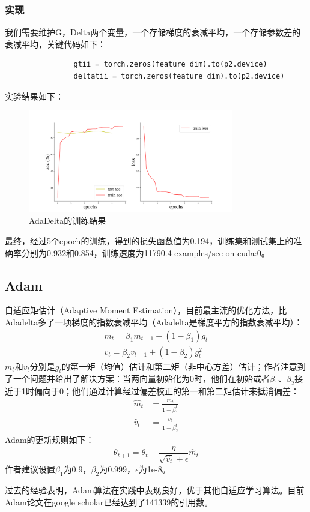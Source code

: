 \documentclass[10.5pt,a4paper]{article}%
\begin{document}
            \subsubsection{实现}
            我们需要维护G，Delta两个变量，一个存储梯度的衰减平均，一个存储参数差的衰减平均，关键代码如下：
            \begin{lstlisting}
                gtii = torch.zeros(feature_dim).to(p2.device)
                deltatii = torch.zeros(feature_dim).to(p2.device)
            \end{lstlisting}\par
\newpage
            实验结果如下：
            \begin{figure}[H]
            \centering
                \includegraphics[width=0.8\textwidth]{imgs_5e/AdaDelta.png}
              \caption{AdaDelta的训练结果}
              \label{fig:adadelta}
            \end{figure}         
            最终，经过5个epoch的训练，得到的损失函数值为0.194，训练集和测试集上的准确率分别为0.932和0.854，训练速度为11790.4 examples/sec on cuda:0。\par
        \subsection{Adam}
            自适应矩估计（Adaptive Moment Estimation）\cite{adam}，目前最主流的优化方法，比Adadelta多了一项梯度的指数衰减平均（Adadelta是梯度平方的指数衰减平均）：
            $$\begin{array}{c}m_t=\beta_1m_{t-1}+(1-\beta_1)g_t\\ v_t=\beta_2v_{t-1}+(1-\beta_2)g_t^2\end{array}$$
            $m_t$和$v_t$分别是$g_t$的第一矩（均值）估计和第二矩（非中心方差）估计；作者注意到了一个问题并给出了解决方案：当两向量初始化为0时，他们在初始或者$\beta_1\text{、}\beta_2$接近于1时偏向于0；他们通过计算经过偏差校正的第一和第二矩估计来抵消偏差：
            \begin{align*}\hat{m}_t&=\frac{m_t}{1-\beta_1^t}\\ \hat{v}_t&=\frac{v_t}{1-\beta_2^t}\end{align*}
            Adam的更新规则如下：
            $$\theta_{t+1}=\theta_t-\dfrac{\eta}{\sqrt{\hat{v}_t}+\epsilon}\hat{m}_t$$
            作者建议设置$\beta_1$为0.9，$\beta_2$为0.999，$\epsilon$为1e-8。\par
            过去的经验表明，Adam算法在实践中表现良好，优于其他自适应学习算法。目前Adam论文在google scholar已经达到了141339的引用数。
\end{document}
